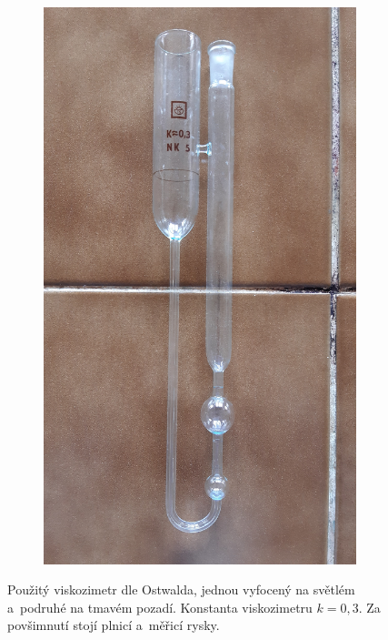 \documentclass[12pt]{article}
\begin{document}
\begin{figure}[h!]
\begin{subfigure}[b]{.5\textwidth}
    \end{subfigure}
    \hfill
    \begin{subfigure}[b]{.5\textwidth}
        \includegraphics[angle = 270, width = \textwidth]{prilohy/muj_ostwald2.jpg}
    \end{subfigure}
    \caption{Použitý viskozimetr dle Ostwalda, jednou vyfocený na světlém a~podruhé na tmavém pozadí. Konstanta viskozimetru $k = 0,3$. Za povšimnutí stojí plnicí a~měřicí rysky.}
    \label{fig:muj_ostwald}
\end{figure}
\end{document}
